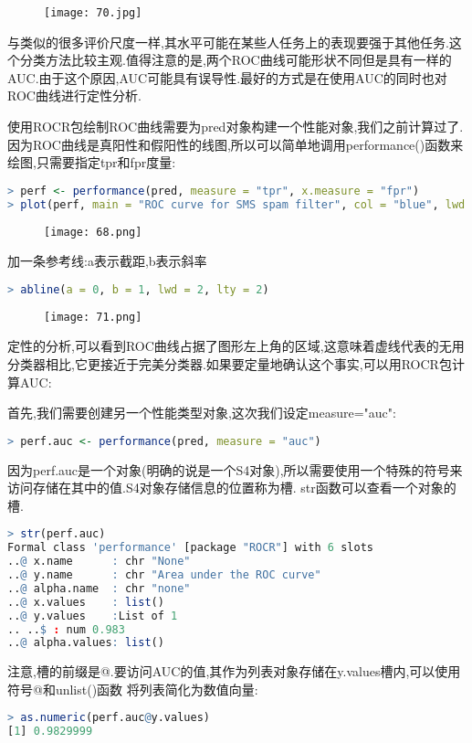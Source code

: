 \documentclass[11pt,a4paper,oneside]{book}
\begin{document}
\begin{figure}[H]
	\centering
	\texttt{[image: 70.jpg]}
\end{figure}

与类似的很多评价尺度一样,其水平可能在某些人任务上的表现要强于其他任务.这个分类方法比较主观.值得注意的是,两个ROC曲线可能形状不同但是具有一样的AUC.由于这个原因,AUC可能具有误导性.最好的方式是在使用AUC的同时也对ROC曲线进行定性分析.

使用ROCR包绘制ROC曲线需要为pred对象构建一个性能对象,我们之前计算过了.因为ROC曲线是真阳性和假阳性的线图,所以可以简单地调用performance()函数来绘图,只需要指定tpr和fpr度量:
\begin{lstlisting}[language=r]
> perf <- performance(pred, measure = "tpr", x.measure = "fpr")
> plot(perf, main = "ROC curve for SMS spam filter", col = "blue", lwd = 2)
\end{lstlisting}
\begin{figure}[H]
	\centering
	\texttt{[image: 68.png]}
\end{figure}
加一条参考线:a表示截距,b表示斜率
\begin{lstlisting}[language=r]
> abline(a = 0, b = 1, lwd = 2, lty = 2)
\end{lstlisting}
\begin{figure}[H]
	\centering
	\texttt{[image: 71.png]}
\end{figure}

定性的分析,可以看到ROC曲线占据了图形左上角的区域,这意味着虚线代表的无用分类器相比,它更接近于完美分类器.如果要定量地确认这个事实,可以用ROCR包计算AUC:

首先,我们需要创建另一个性能类型对象,这次我们设定measure="auc":
\begin{lstlisting}[language=r]
> perf.auc <- performance(pred, measure = "auc")
\end{lstlisting}
因为perf.auc是一个对象(明确的说是一个S4对象),所以需要使用一个特殊的符号来访问存储在其中的值.S4对象存储信息的位置称为槽. str函数可以查看一个对象的槽.
\begin{lstlisting}[language=r]
> str(perf.auc)
Formal class 'performance' [package "ROCR"] with 6 slots
..@ x.name      : chr "None"
..@ y.name      : chr "Area under the ROC curve"
..@ alpha.name  : chr "none"
..@ x.values    : list()
..@ y.values    :List of 1
.. ..$ : num 0.983
..@ alpha.values: list()
\end{lstlisting}
注意,槽的前缀是@.要访问AUC的值,其作为列表对象存储在y.values槽内,可以使用符号@和unlist()函数 将列表简化为数值向量:
\begin{lstlisting}[language=r]
> as.numeric(perf.auc@y.values)
[1] 0.9829999
\end{lstlisting}
\end{document}
